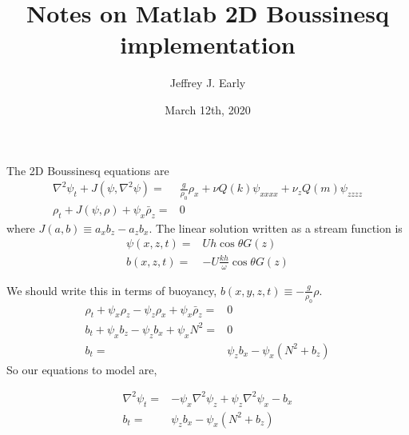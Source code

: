 \documentclass[11pt]{article}
\title{Notes on Matlab 2D Boussinesq implementation}
\author{Jeffrey J. Early}
\date{March 12th, 2020}                                           %
\begin{document}
\maketitle
The 2D Boussinesq equations are
\begin{subequations}{}
\begin{align}
\label{streamfunction_equation}
\nabla^2 \psi_t +  J\left( \psi, \nabla^2 \psi \right) =& \frac{g}{\rho_0}\rho_x + \nu Q(k) \psi_{xxxx} + \nu_z Q(m) \psi_{zzzz} \\ \label{rho_equation}
\rho_t + J\left( \psi, \rho \right) + \psi_x \bar{\rho}_z =& 0
\end{align}
\end{subequations}
where $J(a,b) \equiv a_x b_z - a_z b_x$. The linear solution written as a stream function is
\begin{align}
\label{linear_streamfunction}
\psi(x,z,t) =& U h \cos \theta G(z) \\
b(x,z,t) =& -U \frac{kh}{\omega} \cos \theta G(z)
\end{align}

We should write this in terms of buoyancy, $b(x,y,z,t) \equiv -\frac{g}{\rho_0} \rho$.
\begin{subequations}{}
\begin{align}
\rho_t + \psi_x \rho_z - \psi_z \rho_x + \psi_x \bar{\rho}_z =& 0 \\
b_t + \psi_x b_z - \psi_z b_x + \psi_x N^2 =& 0 \\
b_t =& \psi_z b_x -\psi_x (N^2 + b_z) 
\end{align}
\end{subequations}
So our equations to model are,

\begin{subequations}{}
\begin{align}
\nabla^2 \psi_t =& -  \psi_x \nabla^2 \psi_z + \psi_z \nabla^2 \psi_x  -b_x \\ 
b_t =& \psi_z b_x -\psi_x (N^2 + b_z) 
\end{align}
\end{subequations}
\end{document}
